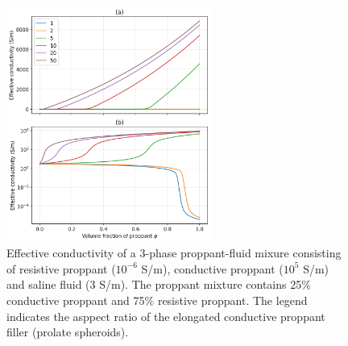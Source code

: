 \begin{figure}
    \begin{center}
    \includegraphics[width=0.6\textwidth]{figures/phys_prop_model/emt_3phase_aspect.png}
    \end{center}
\caption{
    Effective conductivity of a 3-phase proppant-fluid mixure consisting of
    resistive proppant ($10^{-6}$ S/m), conductive proppant ($10^5$ S/m) and saline
    fluid (3 S/m). The proppant mixture contains 25\% conductive proppant and
    75\% resistive proppant. The legend indicates the asppect ratio of the elongated
    conductive proppant filler (prolate spheroids).
}
\label{fig:emt_3phase_aspect}
\end{figure}
